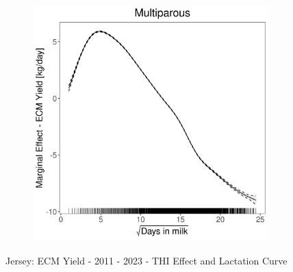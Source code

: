 \begin{figure}[H]
\begin{subfigure}[b]{0.45\textwidth}
    \end{subfigure}
    \hspace{0.05\textwidth} %
    \begin{subfigure}[b]{0.45\textwidth}
        \centering
        \includegraphics[width=\textwidth]{thesis/figures/models/ecm/after2010/je_ecm_after2010/je_ecm_after2010_marginal_dim_milk_multi.png}
    \end{subfigure}
    \caption[]{Jersey: ECM Yield - 2011 - 2023 - THI Effect and Lactation Curve}
    \label{fig:main}
\end{figure}
